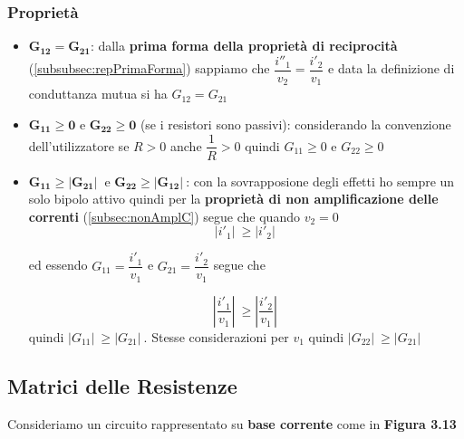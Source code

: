 \documentclass[a4paper]{report}
\begin{document}
\subsubsection{Propriet\`a}
\begin{itemize}
\item $\mathbf{G_{12}=G_{21}}$: dalla {\bf prima forma della propriet\`a
  di reciprocit\`a} (\ref{subsubsec:repPrimaForma}) sappiamo che
  $\dfrac{i''_1}{v_2}=\dfrac{i'_2}{v_1}$ e data la definizione di
  conduttanza mutua si ha $G_{12}=G_{21}$
\item $\mathbf{G_{11} \geq 0}$ e $\mathbf{G_{22} \geq 0}$ (se i
  resistori sono passivi): considerando la convenzione dell'utilizzatore se
  $R>0$ anche $\dfrac{1}{R}>0$ quindi $G_{11} \geq 0$ e $G_{22} \geq 0$
\item $\mathbf{G_{11} \geq |G_{21}|\ }$ e $\mathbf{G_{22} \geq
  |G_{12}|\ }$: con la sovrapposione degli effetti ho sempre un solo
  bipolo attivo quindi per la {\bf propriet\`a di non amplificazione
    delle correnti} (\ref{subsec:nonAmplC}) segue che quando $v_2=0$
  \[
  |i'_1|\ \geq |i'_2|\
  \]

  ed essendo $G_{11}=\dfrac{i'_1}{v_1}$ e $G_{21}=\dfrac{i'_2}{v_1}$
  segue che

  \[
  \left|\dfrac{i'_1}{v_1}\right|\ \geq \left|\dfrac{i'_2}{v_1}\right|\
  \]
  quindi $|G_{11}|\ \geq |G_{21}|\ $.
  Stesse considerazioni per $v_1$ quindi $|G_{22}|\ \geq |G_{21}|\ $
\end{itemize}

\subsection{Matrici delle Resistenze}
Consideriamo un circuito rappresentato su {\bf base corrente} come in
{\bf Figura 3.13}
\end{document}
